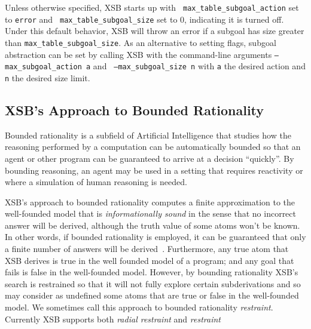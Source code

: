 \noindent
Unless otherwise specified, XSB starts up with {\tt
  max\_table\_subgoal\_action} set to {\tt error} and {\tt
  max\_table\_subgoal\_size} set to 0, indicating it is turned off.
Under this default behavior, XSB will throw an error if a subgoal has
size greater than {\tt max\_table\_subgoal\_size}.  As an alternative
to setting flags, subgoal abstraction can be set by calling XSB with
the command-line arguments {\tt --max\_subgoal\_action a} and {\tt
  --max\_subgoal\_size n} with {\tt a} the desired action and {\tt n}
the desired size limit.

\subsection{XSB's Approach to Bounded Rationality} \label{sec:restraint}
%
Bounded rationality is a subfield of Artificial Intelligence that
studies how the reasoning performed by a computation can be
automatically bounded so that an agent or other program can be
guaranteed to arrive at a decision ``quickly''.  By bounding
reasoning, an agent may be used in a setting that requires reactivity
or where a simulation of human reasoning is needed.


XSB's approach to bounded rationality computes a finite approximation
to the well-founded model that is {\em informationally sound} in the
sense that no incorrect answer will be derived, although the truth
value of some atoms won't be known. In other words, if bounded
rationality is employed, it can be guaranteed that only a finite
number of answers will be derived~\cite{GroS13}.  Furthermore, any
true atom that XSB derives is true in the well founded model of a
program; and any goal that fails is false in the well-founded model.
However, by bounding rationality XSB's search is restrained so that it
will not fully explore certain subderivations and so may consider as
undefined some atoms that are true or false in the well-founded model.
We sometimes call this approach to bounded rationality {\em
  restraint}.  Currently XSB supports both {\em radial restraint} and
{\em \maxans{} restraint}

